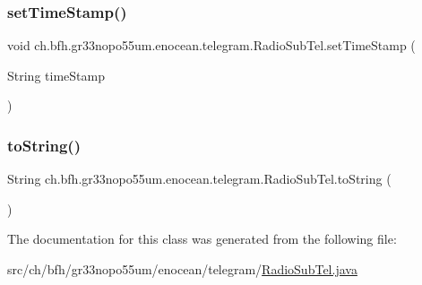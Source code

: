 \hypertarget{classch_1_1bfh_1_1gr33nopo55um_1_1enocean_1_1telegram_1_1_radio_sub_tel_a9551f2a73a965b9753ab1d814d30586e}{}\label{classch_1_1bfh_1_1gr33nopo55um_1_1enocean_1_1telegram_1_1_radio_sub_tel_a9551f2a73a965b9753ab1d814d30586e} 
\subsubsection{\texorpdfstring{set\+Time\+Stamp()}{setTimeStamp()}}
{\footnotesize\ttfamily void ch.\+bfh.\+gr33nopo55um.\+enocean.\+telegram.\+Radio\+Sub\+Tel.\+set\+Time\+Stamp (\begin{DoxyParamCaption}\item[{String}]{time\+Stamp }\end{DoxyParamCaption})}

\hypertarget{classch_1_1bfh_1_1gr33nopo55um_1_1enocean_1_1telegram_1_1_radio_sub_tel_a2ebb85311efd33e64ded6f39de3a966d}{}\label{classch_1_1bfh_1_1gr33nopo55um_1_1enocean_1_1telegram_1_1_radio_sub_tel_a2ebb85311efd33e64ded6f39de3a966d} 
\subsubsection{\texorpdfstring{to\+String()}{toString()}}
{\footnotesize\ttfamily String ch.\+bfh.\+gr33nopo55um.\+enocean.\+telegram.\+Radio\+Sub\+Tel.\+to\+String (\begin{DoxyParamCaption}{ }\end{DoxyParamCaption})}



The documentation for this class was generated from the following file\+:\begin{DoxyCompactItemize}
\item 
src/ch/bfh/gr33nopo55um/enocean/telegram/\hyperlink{ch_2bfh_2gr33nopo55um_2enocean_2telegram_2_radio_sub_tel_8java}{Radio\+Sub\+Tel.\+java}\end{DoxyCompactItemize}
